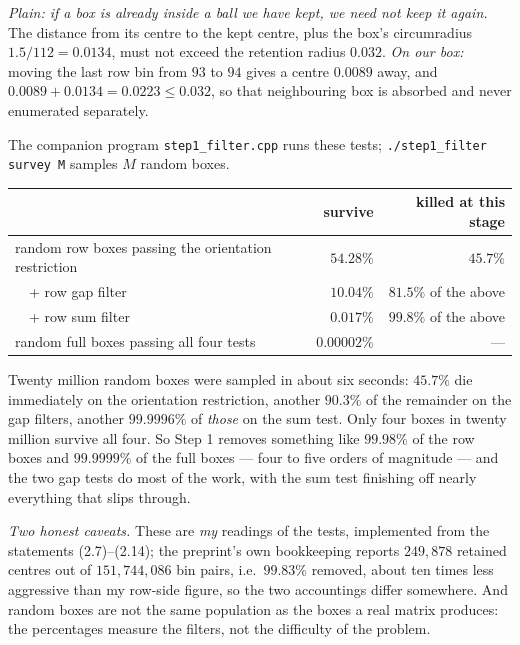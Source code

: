 \documentclass[11pt]{article}
\newcommand{\key}[1]{\par\smallskip\noindent{\bfseries #1}\par\nobreak\vspace{-2pt}}
\begin{document}
\key{Test 4 --- reuse}
\emph{Plain: if a box is already inside a ball we have kept, we need not keep it again.} The distance
from its centre to the kept centre, plus the box's circumradius $1.5/112=0.0134$, must not exceed the
retention radius $0.032$.
\emph{On our box:} moving the last row bin from $93$ to $94$ gives a centre $0.0089$ away, and
$0.0089+0.0134=0.0223\le0.032$, so that neighbouring box is absorbed and never enumerated separately.

\key{How much is thrown away}
The companion program \texttt{step1\_filter.cpp} runs these tests; \texttt{./step1\_filter survey M}
samples $M$ random boxes.

\begin{center}\small
\begin{tabular}{@{}lrr@{}}
\toprule
& survive & killed at this stage\\
\midrule
random row boxes passing the orientation restriction & $54.28\%$ & $45.7\%$\\
\ \ + row gap filter & $10.04\%$ & $81.5\%$ of the above\\
\ \ + row sum filter & $0.017\%$ & $99.8\%$ of the above\\
\midrule
random full boxes passing all four tests & $0.00002\%$ & ---\\
\bottomrule
\end{tabular}
\end{center}

\noindent
Twenty million random boxes were sampled in about six seconds: $45.7\%$ die immediately on the
orientation restriction, another $90.3\%$ of the remainder on the gap filters, another $99.9996\%$ of
\emph{those} on the sum test. Only four boxes in twenty million survive all four. So Step 1 removes
something like $99.98\%$ of the row boxes and $99.9999\%$ of the full boxes --- four to five orders of
magnitude --- and the two gap tests do most of the work, with the sum test finishing off nearly
everything that slips through.

\emph{Two honest caveats.} These are \emph{my} readings of the tests, implemented from the statements
(2.7)--(2.14); the preprint's own bookkeeping reports $249{,}878$ retained centres out of
$151{,}744{,}086$ bin pairs, i.e.\ $99.83\%$ removed, about ten times less aggressive than my row-side
figure, so the two accountings differ somewhere. And random boxes are not the same population as the
boxes a real matrix produces: the percentages measure the filters, not the difficulty of the problem.
\end{document}
